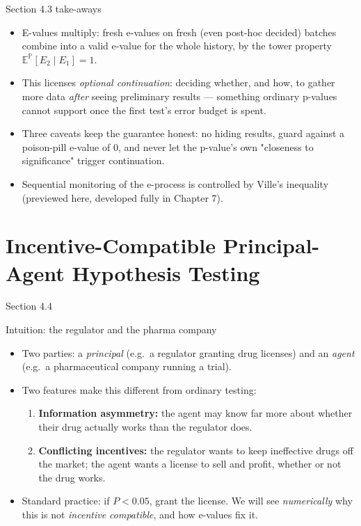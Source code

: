 \documentclass[aspectratio=169,10pt]{beamer}
\begin{document}
\begin{frame}{Section 4.3 take-aways}
  \begin{itemize}
    \item E-values multiply: fresh e-values on fresh (even post-hoc decided)
    batches combine into a valid e-value for the whole history, by the
    tower property $\mathbb E^{\mathbb P}[E_2\mid E_1]=1$.
    \item This licenses \emph{optional continuation}: deciding whether, and
    how, to gather more data \emph{after} seeing preliminary results ---
    something ordinary p-values cannot support once the first test's error
    budget is spent.
    \item Three caveats keep the guarantee honest: no hiding results, guard
    against a poison-pill e-value of $0$, and never let the p-value's own
    "closeness to significance" trigger continuation.
    \item Sequential monitoring of the e-process is controlled by Ville's
    inequality (previewed here, developed fully in Chapter 7).
  \end{itemize}
\end{frame}

\section{Incentive-Compatible Principal-Agent Hypothesis Testing}

\begin{frame}{Section 4.4}
  \tableofcontents[currentsection]
\end{frame}

\begin{frame}{Intuition: the regulator and the pharma company}
  \begin{itemize}
    \item Two parties: a \emph{principal} (e.g.\ a regulator granting drug
    licenses) and an \emph{agent} (e.g.\ a pharmaceutical company running a
    trial).
    \item Two features make this different from ordinary testing:
    \begin{enumerate}
      \item \textbf{Information asymmetry:} the agent may know far more
      about whether their drug actually works than the regulator does.
      \item \textbf{Conflicting incentives:} the regulator wants to keep
      ineffective drugs off the market; the agent wants a license to sell
      and profit, whether or not the drug works.
      \end{enumerate}
    \item Standard practice: if $P<0.05$, grant the license. We will see
    \emph{numerically} why this is not \emph{incentive compatible}, and how
    e-values fix it.
  \end{itemize}
\end{frame}
\end{document}
